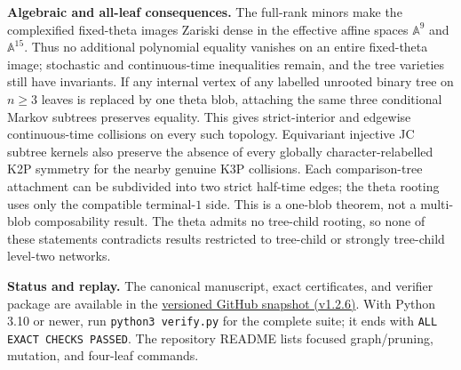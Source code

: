 \documentclass[10pt]{article}
\begin{document}
\textbf{Algebraic and all-leaf consequences.} The full-rank minors make the complexified fixed-theta images Zariski dense in the effective affine spaces $\mathbb A^9$ and $\mathbb A^{15}$. Thus no additional polynomial equality vanishes on an entire fixed-theta image; stochastic and continuous-time inequalities remain, and the tree varieties still have invariants. If any internal vertex of any labelled unrooted binary tree on $n\ge3$ leaves is replaced by one theta blob, attaching the same three conditional Markov subtrees preserves equality. This gives strict-interior and edgewise continuous-time collisions on every such topology. Equivariant injective JC subtree kernels also preserve the absence of every globally character-relabelled K2P symmetry for the nearby genuine K3P collisions. Each comparison-tree attachment can be subdivided into two strict half-time edges; the theta rooting uses only the compatible terminal-$1$ side. This is a one-blob theorem, not a multi-blob composability result. The theta admits no tree-child rooting, so none of these statements contradicts results restricted to tree-child or strongly tree-child level-two networks.

\textbf{Status and replay.} The canonical manuscript, exact certificates, and verifier package are available in the \href{https://github.com/AlecKriebel/Math/tree/k2p-k3p-theta-v1.2.6/k2p_k3p_theta_trinet_collision/k2p_k3p_theta_clarified}{versioned GitHub snapshot (v1.2.6)}. With Python 3.10 or newer, run \texttt{python3 verify.py} for the complete suite; it ends with \texttt{ALL EXACT CHECKS PASSED}. The repository README lists focused graph/pruning, mutation, and four-leaf commands.
\end{document}
